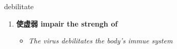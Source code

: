 
\begin{frame}
{\huge debilitate}
\begin{center}
\begin{enumerate}\Large
  \item \textbf{使虚弱 impair the strengh of}
  \begin{itemize}
    \item \em{\Large{The virus debilitates the body's immue system}}
  \end{itemize}
\end{enumerate}
\end{center}
\end{frame}
